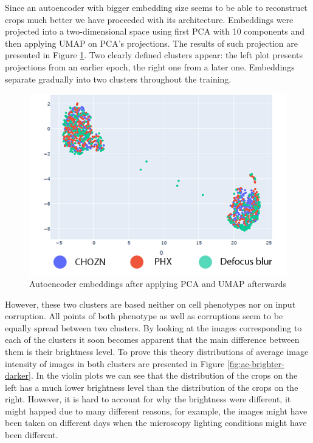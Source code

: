 Since an autoencoder with bigger embedding size seems to be able to reconstruct crops much better we have proceeded with its architecture. Embeddings were projected into a two-dimensional space using first PCA with 10 components and then applying UMAP on PCA's projections. The results of such projection are presented in Figure \ref{fig:ae-pca-umap-clustered}. Two clearly defined clusters appear: the left plot presents projections from an earlier epoch, the right one from a later one. Embeddings separate gradually into two clusters throughout the training.

\begin{figure}[htb]
	\begin{center}
		\includegraphics[width=0.5\linewidth]{bilder/ae-embeddings/pca-umap-clusters.png}
		\caption{Autoencoder embeddings after applying PCA and UMAP afterwards}\label{fig:ae-pca-umap-clustered}
	\end{center}
\end{figure}

However, these two clusters are based neither on cell phenotypes nor on input corruption. All points of both phenotype as well as corruptions seem to be equally spread between two clusters. By looking at the images corresponding to each of the clusters it soon becomes apparent that the main difference between them is their brightness level.  To prove this theory distributions of average image intensity of images in both clusters are presented in Figure \ref{fig:ae-brighter-darker}. In the violin plots we can see that the distribution of the crops on the left has a much lower brightness level than the distribution of the crops on the right. However, it is hard to account for why the brightness were different, it might happed due to many different reasons, for example, the images might have been taken on different days when the microscopy lighting conditions might have been different.

